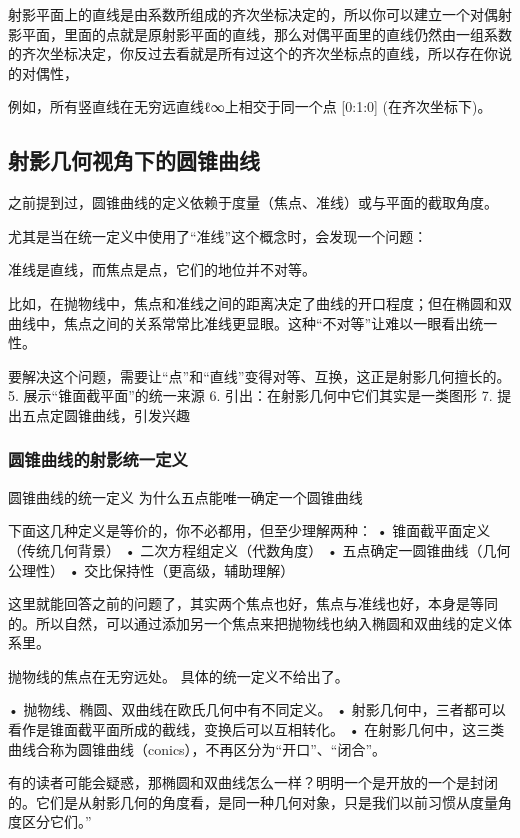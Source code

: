 射影平面上的直线是由系数所组成的齐次坐标决定的，所以你可以建立一个对偶射影平面，里面的点就是原射影平面的直线，那么对偶平面里的直线仍然由一组系数的齐次坐标决定，你反过去看就是所有过这个的齐次坐标点的直线，所以存在你说的对偶性，



例如，所有竖直线在无穷远直线ℓ∞上相交于同一个点 [0:1:0] (在齐次坐标下)。
\subsection{射影几何视角下的圆锥曲线}

之前提到过，圆锥曲线的定义依赖于度量（焦点、准线）或与平面的截取角度。

尤其是当在统一定义中使用了“准线”这个概念时，会发现一个问题：

准线是直线，而焦点是点，它们的地位并不对等。

比如，在抛物线中，焦点和准线之间的距离决定了曲线的开口程度；但在椭圆和双曲线中，焦点之间的关系常常比准线更显眼。这种“不对等”让难以一眼看出统一性。

要解决这个问题，需要让“点”和“直线”变得对等、互换，这正是射影几何擅长的。
	5.	展示“锥面截平面”的统一来源
	6.	引出：在射影几何中它们其实是一类图形
	7.	提出五点定圆锥曲线，引发兴趣

\subsubsection{圆锥曲线的射影统一定义}

圆锥曲线的统一定义	为什么五点能唯一确定一个圆锥曲线


下面这几种定义是等价的，你不必都用，但至少理解两种：
	•	锥面截平面定义（传统几何背景）
	•	二次方程组定义（代数角度）
	•	五点确定一圆锥曲线（几何公理性）
	•	交比保持性（更高级，辅助理解）

这里就能回答之前的问题了，其实两个焦点也好，焦点与准线也好，本身是等同的。所以自然，可以通过添加另一个焦点来把抛物线也纳入椭圆和双曲线的定义体系里。

抛物线的焦点在无穷远处。
具体的统一定义不给出了。

	•	抛物线、椭圆、双曲线在欧氏几何中有不同定义。
	•	射影几何中，三者都可以看作是锥面截平面所成的截线，变换后可以互相转化。
	•	在射影几何中，这三类曲线合称为圆锥曲线（conics），不再区分为“开口”、“闭合”。

有的读者可能会疑惑，那椭圆和双曲线怎么一样？明明一个是开放的一个是封闭的。它们是从射影几何的角度看，是同一种几何对象，只是我们以前习惯从度量角度区分它们。”

